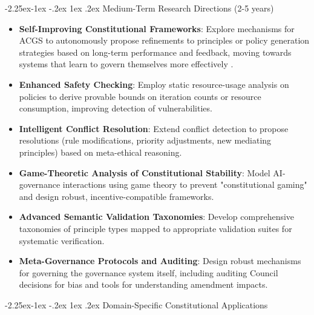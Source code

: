 \documentclass[manuscript,screen,9pt]{acmart}
\makeatletter
\renewcommand\subsection{\@startsection{subsection}{2}{\z@}%
  {-2.25ex\@plus -1ex \@minus -.2ex}%
  {1ex \@plus .2ex}%
  {\normalfont\large\bfseries}}
\makeatother
\begin{document}
\subsection{Medium-Term Research Directions (2-5 years)}
\label{subsec:medium_term_research}
\begin{itemize}[leftmargin=*,itemsep=1pt,parsep=1pt]
	\item \textbf{Self-Improving Constitutional Frameworks}: Explore mechanisms for ACGS to autonomously propose refinements to principles or policy generation strategies based on long-term performance and feedback, moving towards systems that learn to govern themselves more effectively \cite{Zhao2025AbsoluteZero}.
	\item \textbf{Enhanced Safety Checking}: Employ static resource-usage analysis on policies to derive provable bounds on iteration counts or resource consumption, improving detection of vulnerabilities.
	\item \textbf{Intelligent Conflict Resolution}: Extend conflict detection to propose resolutions (rule modifications, priority adjustments, new mediating principles) based on meta-ethical reasoning.
	\item \textbf{Game-Theoretic Analysis of Constitutional Stability}: Model AI-governance interactions using game theory to prevent "constitutional gaming" and design robust, incentive-compatible frameworks.
	\item \textbf{Advanced Semantic Validation Taxonomies}: Develop comprehensive taxonomies of principle types mapped to appropriate validation suites for systematic verification.
	\item \textbf{Meta-Governance Protocols and Auditing}: Design robust mechanisms for governing the governance system itself, including auditing Council decisions for bias and tools for understanding amendment impacts.
\end{itemize}

\subsection{Domain-Specific Constitutional Applications}
\label{subsec:domain_applications}
\end{document}
